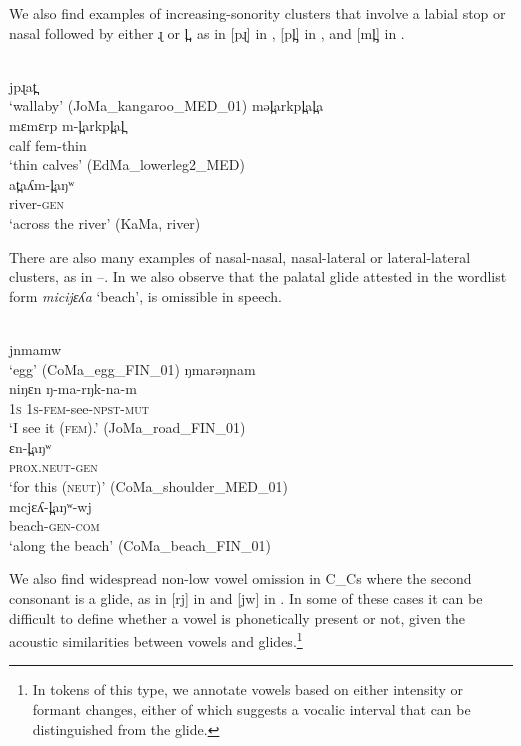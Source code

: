 \documentclass[output=paper,colorlinks,citecolor=brown]{langscibook}
\begin{document}
We also find examples of increasing-sonority clusters that involve a labial stop or nasal followed by either ɻ or l̪, as in [pɻ] in , [pl̪] in , and [ml̪] in .

\ea\label{ex:mansfield:6}
\\
       jpɻat̪\\
\glt   ‘wallaby’ (JoMa\_kangaroo\_MED\_01)
\ex\label{ex:mansfield:7}
 {məl̪arkpl̪al̪a}\\
       mɛmɛrp m-l̪arkpl̪al̪\\
       calf fem-thin\\
\glt   ‘thin calves’ (EdMa\_lowerleg2\_MED)
\ex\label{ex:mansfield:8}
\\
       at̪aʎm-l̪aŋʷ\\
       river-\textsc{gen}\\
\glt   ‘across the river’ (KaMa, river)
\z

There are also many examples of nasal-nasal, nasal-lateral or lateral-lateral clusters, as in –. In  we also observe that the palatal glide attested in the wordlist form \textit{micijɛʎa} ‘beach’, is omissible in speech.

\ea\label{ex:mansfield:9}
\\
       jnmamw\\
\glt   ‘egg’ (CoMa\_egg\_FIN\_01)
\ex\label{ex:mansfield:10}
 {ŋmarəŋnam}\\
       niŋɛn ŋ-ma-rŋk-na-m\\
       \textsc{1s} \textsc{1s-fem}{}-see-\textsc{npst-mut}\\
\glt   ‘I see it (\textsc{fem}).’ (JoMa\_road\_FIN\_01)
\ex\label{ex:mansfield:11}
\\
       ɛn-l̪aŋʷ\\
       \textsc{prox.neut-gen}\\
\glt   ‘for this (\textsc{neut})’ (CoMa\_shoulder\_MED\_01)
\ex\label{ex:mansfield:12}
  \\
       mcjɛʎ-l̪aŋʷ-wj\\
       beach-\textsc{gen-com}\\
\glt   ‘along the beach’ (CoMa\_beach\_FIN\_01)\z


We also find widespread non-low vowel omission in C\_Cs where the second consonant is a glide, as in [rj] in  and [jw] in . In some of these cases it can be difficult to define whether a vowel is phonetically present or not, given the acoustic similarities between vowels and glides.\footnote{In tokens of this type, we annotate vowels based on either intensity or formant changes, either of which suggests a vocalic interval that can be distinguished from the glide.}
\end{document}
